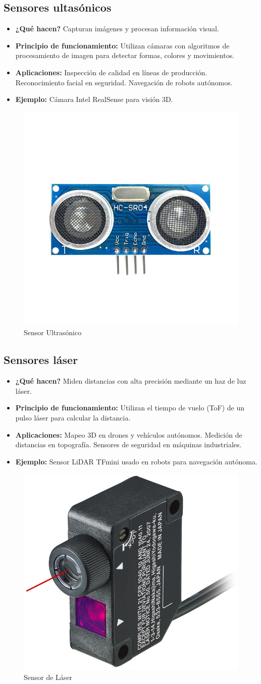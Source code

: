\subsection*{Sensores ultasónicos}
\begin{itemize}
	\item \textbf{¿Qué hacen?} Capturan imágenes y procesan información visual.
	\item \textbf{Principio de funcionamiento:} Utilizan cámaras con algoritmos de procesamiento de imagen para detectar formas, colores y movimientos.
	\item \textbf{Aplicaciones:} Inspección de calidad en líneas de producción.
	Reconocimiento facial en seguridad.
	Navegación de robots autónomos.
	\item \textbf{Ejemplo:} Cámara Intel RealSense para visión 3D.
	\cite{makeblock_sensores_2025}
\end{itemize}
\begin{figure}[h]
	\centering
	\includegraphics[width=0.3\linewidth]{img/sensor ultrasonico}
	\caption{Sensor Ultrasónico}
	\label{fig:sensor ultrasonico}
\end{figure}

\subsection*{Sensores láser}
\begin{itemize}
	\item \textbf{¿Qué hacen?} Miden distancias con alta precisión mediante un haz de luz láser.
	\item \textbf{Principio de funcionamiento:} Utilizan el tiempo de vuelo (ToF) de un pulso láser para calcular la distancia.
	\item \textbf{Aplicaciones:} Mapeo 3D en drones y vehículos autónomos.
	Medición de distancias en topografía.
	Sensores de seguridad en máquinas industriales.
	\item \textbf{Ejemplo:} Sensor LiDAR TFmini usado en robots para navegación autónoma.	\cite{makeblock_sensores_2025}
\end{itemize} 
\begin{figure}[h]
	\centering
	\includegraphics[width=0.3\linewidth]{img/sensor laser}
	\caption{Sensor de Láser}
	\label{fig:sensor laser} 
\end{figure}
\vspace{15cm}
